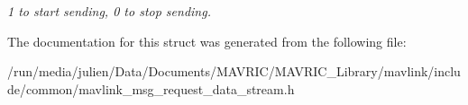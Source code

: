 \begin{DoxyCompactItemize}
\begin{DoxyCompactList}\small\item\em 1 to start sending, 0 to stop sending. \end{DoxyCompactList}\end{DoxyCompactItemize}


The documentation for this struct was generated from the following file\+:\begin{DoxyCompactItemize}
\item 
/run/media/julien/\+Data/\+Documents/\+M\+A\+V\+R\+I\+C/\+M\+A\+V\+R\+I\+C\+\_\+\+Library/mavlink/include/common/mavlink\+\_\+msg\+\_\+request\+\_\+data\+\_\+stream.\+h\end{DoxyCompactItemize}
